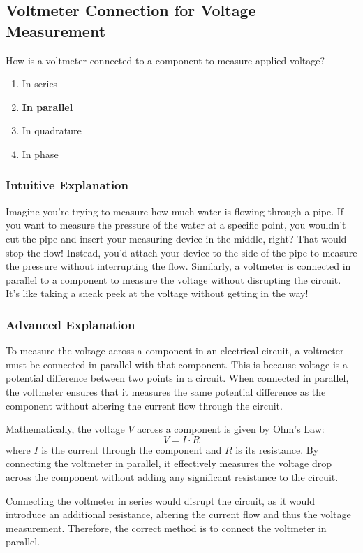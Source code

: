 \subsection{Voltmeter Connection for Voltage Measurement}
\label{T7D02}

\begin{tcolorbox}[colback=gray!10!white,colframe=black!75!black,title=T7D02]
How is a voltmeter connected to a component to measure applied voltage?
\begin{enumerate}[label=\Alph*)]
    \item In series
    \item \textbf{In parallel}
    \item In quadrature
    \item In phase
\end{enumerate}
\end{tcolorbox}

\subsubsection{Intuitive Explanation}
Imagine you're trying to measure how much water is flowing through a pipe. If you want to measure the pressure of the water at a specific point, you wouldn't cut the pipe and insert your measuring device in the middle, right? That would stop the flow! Instead, you'd attach your device to the side of the pipe to measure the pressure without interrupting the flow. Similarly, a voltmeter is connected in parallel to a component to measure the voltage without disrupting the circuit. It's like taking a sneak peek at the voltage without getting in the way!

\subsubsection{Advanced Explanation}
To measure the voltage across a component in an electrical circuit, a voltmeter must be connected in parallel with that component. This is because voltage is a potential difference between two points in a circuit. When connected in parallel, the voltmeter ensures that it measures the same potential difference as the component without altering the current flow through the circuit.

Mathematically, the voltage \( V \) across a component is given by Ohm's Law:
\[
V = I \cdot R
\]
where \( I \) is the current through the component and \( R \) is its resistance. By connecting the voltmeter in parallel, it effectively measures the voltage drop across the component without adding any significant resistance to the circuit.

Connecting the voltmeter in series would disrupt the circuit, as it would introduce an additional resistance, altering the current flow and thus the voltage measurement. Therefore, the correct method is to connect the voltmeter in parallel.

